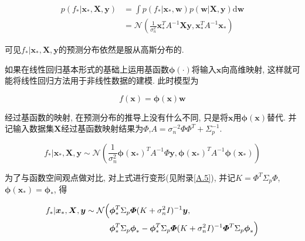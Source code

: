                 \begin{equation}\label{2.28}
                    \begin{aligned}
                    p(f_{*}|\boldsymbol{x}_{*},\boldsymbol{X},\boldsymbol{y})
                    &=\int p(f_{*}|\boldsymbol{x}_{*},\boldsymbol{w})p(\boldsymbol{w}|\boldsymbol{X},\boldsymbol{y}) \mathrm{d}\boldsymbol{w} \\
                    &=\mathcal{N}(\frac{1}{\sigma^{2}_{n}}\boldsymbol{x}^{T}_{*}A^{-1}\boldsymbol{Xy},\boldsymbol{x}^{T}_{*}A^{-1}\boldsymbol{x}_{*})
                    \end{aligned}
                \end{equation}
                
                可见$f_{*}|\boldsymbol{x}_{*},\boldsymbol{X},\boldsymbol{y}$的预测分布依然是服从高斯分布的.

                如果在线性回归基本形式的基础上运用基函数$\boldsymbol{\phi}(\cdot)$将输入$\boldsymbol{x}$向高维映射, 这样就可能将线性回归方法用于非线性数据的建模. 此时模型为

                \begin{equation} \label{2.29}
                    f(\boldsymbol{x})=\boldsymbol{\phi}(\boldsymbol{x})\boldsymbol{w}
                \end{equation}

                经过基函数的映射, 在预测分布的推导上没有什么不同, 只是将$\boldsymbol{x}$用$\boldsymbol{\phi}(\boldsymbol{x})$替代. 并记输入数据集$\boldsymbol{X}$经过基函数映射结果为$\boldsymbol{\varPhi}$,$A=\sigma^{-2}_{n}\boldsymbol{\varPhi}\boldsymbol{\varPhi}^{T}+\Sigma^{-1}_{p}$.

                \begin{equation} \label{2.30}
                    f_{*}|\boldsymbol{x}_{*},\boldsymbol{X},\boldsymbol{y}\sim\mathcal{N}\left(\frac{1}{\sigma^{2}_{n}}\boldsymbol{\phi}(\boldsymbol{x}_{*})^{T}A^{-1}\boldsymbol{\varPhi y},\boldsymbol{\phi}(\boldsymbol{x}_{*})^{T}A^{-1}\boldsymbol{\phi}(\boldsymbol{x}_{*})\right)
                \end{equation}

                为了与函数空间观点做对比, 对上式进行变形(见附录\ref{A.5}), 并记$K=\boldsymbol{\varPhi}^{T}\Sigma_{p}\boldsymbol{\varPhi}$, $\boldsymbol{\phi}(\boldsymbol{x}_{*})=\boldsymbol{\phi}_{*}$, 得

                \begin{equation}\label{2.31}
                    \begin{aligned}
                        f_{*}|\boldsymbol{x}_{*},\boldsymbol{X},\boldsymbol{y}\sim\mathcal{N}\Bigl(
                        &\boldsymbol{\phi}^{T}_{*}\Sigma_{p}\boldsymbol{\varPhi}(K+\sigma^{2}_{n}I)^{-1}\boldsymbol{y}, \\
                        &\boldsymbol{\phi}^{T}_{*}\Sigma_{p}\boldsymbol{\phi}_{*} -  \boldsymbol{\phi}^{T}_{*}\Sigma_{p}\boldsymbol{\varPhi}(K+\sigma^{2}_{n}I)^{-1} \boldsymbol{\varPhi}^{T}\Sigma_{p}\boldsymbol{\phi}_{*}\Bigl)
                    \end{aligned}
                \end{equation}

